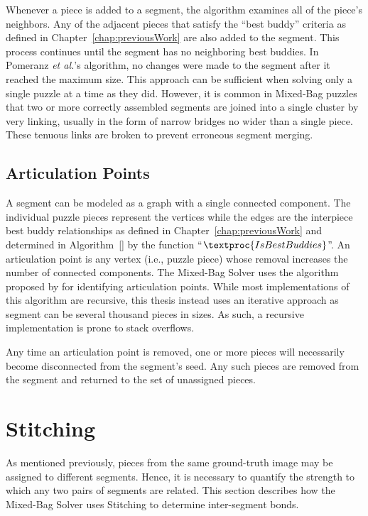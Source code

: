 Whenever a piece is added to a segment, the algorithm examines all of the piece's neighbors.  Any of the adjacent pieces that satisfy the ``best buddy'' criteria as defined in Chapter~\ref{chap:previousWork} are also added to the segment.  This process continues until the segment has no neighboring best buddies. In Pomeranz \textit{et al.}'s algorithm, no changes were made to the segment after it reached the maximum size.  This approach can be sufficient when solving only a single puzzle at a time as they did.  However, it is common in Mixed-Bag puzzles that two or more correctly assembled segments are joined into a single cluster by very linking, usually in the form of narrow bridges no wider than a single piece.  These tenuous links are broken to prevent erroneous segment merging.  

\subsection{Articulation Points}\label{sec:ArticulationPoints}

A segment can be modeled as a graph with a single connected component.  The individual puzzle pieces represent the vertices while the edges are the interpiece best buddy relationships as defined in Chapter~\ref{chap:previousWork} and determined in Algorithm~\ref{} by the function ``$\textproc{IsBestBuddies}$''.  An articulation point is any vertex (i.e., puzzle piece) whose removal increases the number of connected components.  The Mixed-Bag Solver uses the algorithm proposed by \cite{cormenIntroToAlgorithms} for identifying articulation points.  While most implementations of this algorithm are recursive, this thesis instead uses an iterative approach as segment can be several thousand pieces in sizes.  As such, a recursive implementation is prone to stack overflows.

Any time an articulation point is removed, one or more pieces will necessarily become disconnected from the segment's seed.  Any such pieces are removed from the segment and returned to the set of unassigned pieces.  

\section{Stitching}\label{sec:stitching}

As mentioned previously, pieces from the same ground-truth image may be assigned to different segments.  Hence, it is necessary to quantify the strength to which any two pairs of segments are related.  This section describes how the Mixed-Bag Solver uses Stitching to determine inter-segment bonds.

